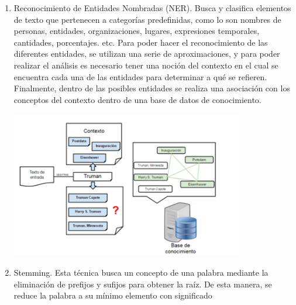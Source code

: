 \begin{enumerate}
\item Reconocimiento de Entidades Nombradas (NER). Busca y clasifica elementos de texto que pertenecen a categorías predefinidas, como lo son nombres de personas, entidades, organizaciones, lugares, expresiones temporales, cantidades, porcentajes. etc.
Para poder hacer el reconocimiento de las diferentes entidades, se utilizan una serie de aproximaciones, y para poder realizar el análisis es necesario tener una noción del contexto en el cual se encuentra cada una de las entidades para determinar a qué se refieren. Finalmente, dentro de las posibles entidades se realiza una asociación con los conceptos del contexto dentro de una base de datos de conocimiento.
\begin{center}
    \includegraphics[width=0.8\textwidth]{Images/truman.png}
\end{center}
\item Stemming. Esta técnica busca un concepto de una palabra mediante la eliminación de prefijos y sufijos para obtener la raíz. De esta manera, se reduce la palabra a su mínimo elemento con significado


\end{enumerate}
